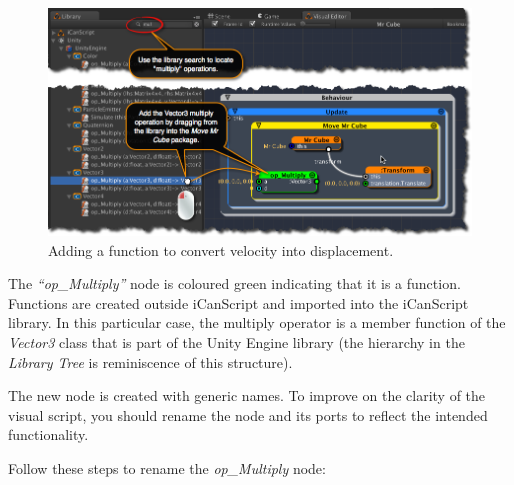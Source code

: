 \begin{figure}[htbp]
\centering
\includegraphics[keepaspectratio,width=\textwidth,height=0.75\textheight]{adding-velocity-to-displacement-node.png}
\caption{Adding a function to convert velocity into displacement.}
\label{adding-velocity-to-displacement-node.png}
\end{figure}

The \emph{``op\_Multiply''} node is coloured green indicating that it is a function. Functions are created outside iCanScript and imported into the iCanScript library. In this particular case, the multiply operator is a member function of the \emph{Vector3} class that is part of the Unity Engine library (the hierarchy in the \emph{Library Tree} is reminiscence of this structure).

The new node is created with generic names. To improve on the clarity of the visual script, you should rename the node and its ports to reflect the intended functionality.

Follow these steps to rename the \emph{op\_Multiply} node:


